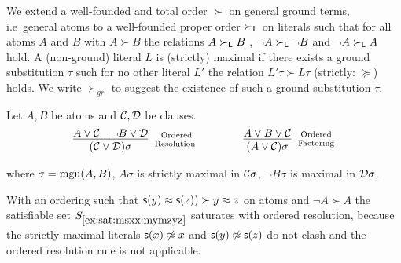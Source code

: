 \begin{definition}\label{def:orders-on-literals}
	We extend a well-founded and total order $\succ$ on general ground terms, 
	i.e~general atoms to a well-founded proper order $\succ_{\mathsf L}$ 
	on literals such that for all atoms $A$ and $B$ with $A\succ B$ 
	the relations $A\succ_{\mathsf L} B$ , 
	$\lnot A\succ_{\mathsf L}\lnot B$ and 
	$\lnot A\succ_{\mathsf L} A$ hold. 
	A (non-ground) literal $L$ is {\myem (strictly) maximal} if there exists a ground substitution $\tau$ 
	such for no other literal $L'$ the relation $L'\tau\succ L\tau$ (strictly: $\succcurlyeq$) holds.
	We write $\succ_{gr}$ to suggest the existence of such a ground substitution $\tau$.
\end{definition}

\begin{definition}\label{def:ordered:resolution} 
	Let $A, B$ be atoms and ${\mathcal C},{\mathcal D}$ be clauses.
	\begin{gather*}
	\infer
	[\text{Ordered}\atop\text{Resolution	}] 
	{(\mcC\lor\mcD)\sigma}
	{A\lor\mcC&\lnot B\lor\mcD}
	\qquad\qquad
	\infer
	[\text{Ordered}\atop\text{Factoring}] 
	{(A\lor\mcC)\sigma}
	{A\lor B\lor\mcC}
	\end{gather*}
	\begin{center}
		where $\sigma=\operatorname{mgu}(A,B)$, 
		$A\sigma$ is strictly maximal in ${\mathcal C}\sigma$, 
		$\lnot B\sigma$ is maximal in ${\mathcal D}\sigma$.
	\end{center}
\end{definition}

\begin{example}
	With an ordering such that ${\mathsf s}(y)\approx{\mathsf s}(z)) \succ y\approx z$ on atoms and ${\lnot A} \succ A$
	the satisfiable set $S_{\ref{ex:sat:msxx:mymzyz}}$ saturates with ordered resolution,
	because the strictly maximal literals 
	${\mathsf s}(x)\not\approx x$ and
	${\mathsf s}(y)\not\approx{\mathsf s}(z)$
	do not clash and the ordered resolution rule is not applicable.
\end{example}


